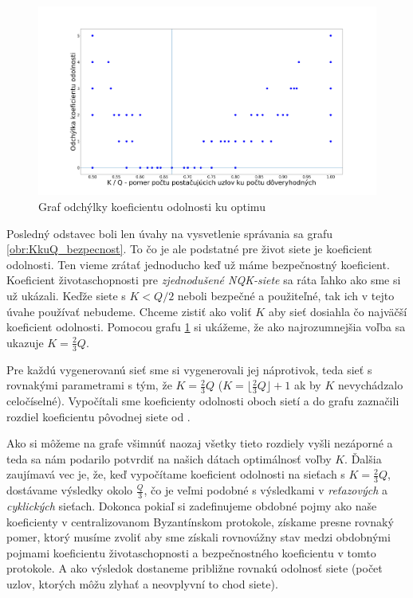 \begin{figure}
\centerline{\includegraphics[width=1.2\textwidth]{images/KkuQ_odchylka.png}}
\caption{Graf odchýlky koeficientu odolnosti ku optimu} \label{obr:KkuQ_odchylka}
\end{figure}

Posledný odstavec boli len úvahy na vysvetlenie správania sa grafu
\ref{obr:KkuQ_bezpecnost}.
To čo je ale podstatné pre život siete je koeficient odolnosti. Ten vieme zrátať
jednoducho keď už máme bezpečnostný koeficient. Koeficient životaschopnosti
pre \textit{zjednodušené NQK-siete} sa ráta ľahko ako sme si už ukázali.
Keďže siete s $K < Q/2$ neboli bezpečné a použiteľné, tak ich v tejto úvahe
používať nebudeme.
Chceme zistiť ako voliť $K$ aby sieť dosiahla čo najväčší koeficient odolnosti.
Pomocou grafu \ref{obr:KkuQ_odchylka} si ukážeme, že ako najrozumnejšia
voľba sa ukazuje $K=\frac{2}{3}Q$.

Pre každú vygenerovanú sieť sme si vygenerovali jej  náprotivok,
teda sieť s rovnakými parametrami s tým, že $K=\frac{2}{3}Q$
($K=\lfloor\frac{2}{3}Q\rfloor+1$ ak by $K$ nevychádzalo celočíselné).
Vypočítali sme koeficienty odolnosti oboch sietí a do grafu zaznačili rozdiel
koeficientu pôvodnej siete od .

Ako si môžeme na grafe všimnúť naozaj všetky tieto rozdiely vyšli nezáporné
a teda sa nám podarilo potvrdiť na našich dátach optimálnosť voľby $K$.
Ďalšia zaujímavá vec je, že, keď vypočítame koeficient odolnosti na sieťach
s $K=\frac{2}{3}Q$, dostávame výsledky okolo $\frac{Q}{3}$, čo je veľmi
podobné s výsledkami v \textit{reťazových} a \textit{cyklických} sieťach.
Dokonca pokiaľ si zadefinujeme obdobné pojmy ako naše koeficienty v
centralizovanom Byzantínskom protokole\cite{li2007beyond}, získame presne
rovnaký pomer, ktorý musíme zvoliť aby sme získali rovnovážny stav medzi
obdobnými pojmami koeficientu životaschopnosti a bezpečnostného koeficientu
v tomto protokole. A ako výsledok dostaneme približne rovnakú odolnosť siete
(počet uzlov, ktorých môžu zlyhať a neovplyvní to chod siete).

